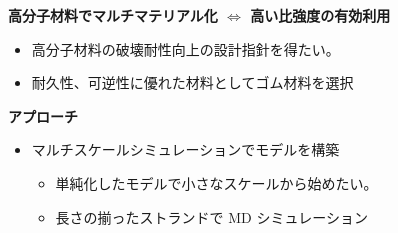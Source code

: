 \begin{columns}[totalwidth=.85\linewidth]
	\column{\textwidth}
	\vspace{-10mm}
		\begin{boxnote}
			\textbf{高分子材料でマルチマテリアル化 $\Leftrightarrow$ 高い比強度の有効利用}
                \begin{itemize}
                    \item 高分子材料の破壊耐性向上の設計指針を得たい。
                    \item 耐久性、可逆性に優れた材料としてゴム材料を選択
                \end{itemize}
			\textbf{アプローチ}
				\begin{itemize}
					\item マルチスケールシミュレーションで\color{red}モデル\color{black}を構築
					\begin{itemize}
						\normalsize
						\item 単純化したモデルで小さなスケールから始めたい。
						\item \alert{長さの揃ったストランドで MD シミュレーション}
					\end{itemize}
				\end{itemize}
		\end{boxnote}


\end{columns}
